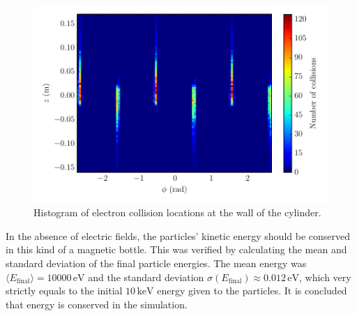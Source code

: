 \documentclass[12pt, a4paper]{article}
\begin{document}
\begin{figure}
    \centering
    \includegraphics{output/cylinder_collision_points.pdf}
    \caption{Histogram of electron collision locations at the wall of the cylinder.}
    \label{fig:wall}
\end{figure}

In the absence of electric fields, the particles' kinetic energy should be conserved in this kind of a magnetic bottle. This was verified by calculating the mean and standard deviation of the final particle energies. The mean energy was $\langle E_\text{final} \rangle = 10000\,\si{\electronvolt}$ and the standard deviation $\sigma(E_\text{final}) \approx 0.012\,\si{\electronvolt}$, which very strictly equals to the initial $10\,\si{\kilo\electronvolt}$ energy given to the particles. It is concluded that energy is conserved in the simulation.
\end{document}

